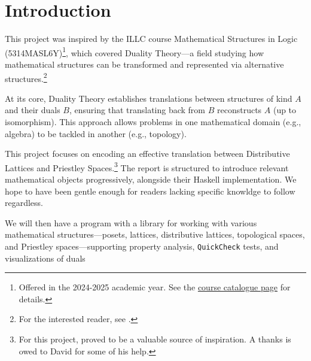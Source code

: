 \section{Introduction}
\label{sec:introduction}
This project was inspired by the ILLC course Mathematical Structures in Logic (5314MASL6Y)\footnote{Offered in the 2024-2025 academic year. See the \href{https://studiegids.uva.nl/xmlpages/page/2024-2025-en/search-course/course/118785}{course catalogue page} for details.}, which covered Duality Theory—a field studying how mathematical structures can be transformed and represented via alternative structures.\footnote{For the interested reader, see \cite{burrisCourseUniversalAlgebra2012, daveyIntroductionLatticesOrder2010, johnstoneStoneSpaces1992, kelleyGeneralTopology2007, munkresTopology2000}.}

At its core, Duality Theory establishes translations between structures of kind $A$ and their duals $B$, ensuring that translating back from $B$ reconstructs $A$ (up to isomorphism). This approach allows problems in one mathematical domain (e.g., algebra) to be tackled in another (e.g., topology).

This project focuses on encoding an effective translation between Distributive Lattices and Priestley Spaces.\footnote{For this project, \cite{quinnalvarezTopomodels2025} proved to be a valuable source of inspiration. A thanks is owed to David for some of his help.} The report is structured to introduce relevant mathematical objects progressively, alongside their Haskell implementation. We hope to have been gentle enough for readers lacking specific knowldge to follow regardless.

We will then have a program with a library for working with various mathematical structures—posets, lattices, distributive lattices, topological spaces, and Priestley spaces—supporting property analysis, \texttt{QuickCheck} tests, and visualizations of duals










